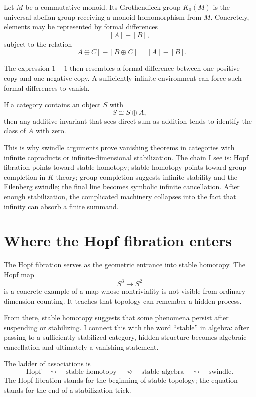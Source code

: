 \begin{definition}
Let \(M\) be a commutative monoid.  Its Grothendieck group \(K_0(M)\) is the universal abelian group receiving a monoid homomorphism from \(M\).  Concretely, elements may be represented by formal differences
\[
  [A]-[B],
\]
subject to the relation
\[
  [A\oplus C]-[B\oplus C]=[A]-[B].
\]
\end{definition}

The expression \(1-1\) then resembles a formal difference between one positive copy and one negative copy.  A sufficiently infinite environment can force such formal differences to vanish.

\begin{proposition}
If a category contains an object \(S\) with
\[
  S\cong S\oplus A,
\]
then any additive invariant that sees direct sum as addition tends to identify the class of \(A\) with zero.
\end{proposition}

This is why swindle arguments prove vanishing theorems in categories with infinite coproducts or infinite-dimensional stabilization.  The chain I see is: Hopf fibration points toward stable homotopy; stable homotopy points toward group completion in \(K\)-theory; group completion suggests infinite stability and the Eilenberg swindle; the final line becomes symbolic infinite cancellation.
After enough stabilization, the complicated machinery collapses into the fact that infinity can absorb a finite summand.

\section{Where the Hopf fibration enters}

The Hopf fibration serves as the geometric entrance into stable homotopy.  The Hopf map
\[
  S^3\to S^2
\]
is a concrete example of a map whose nontriviality is not visible from ordinary dimension-counting.  It teaches that topology can remember a hidden process.

From there, stable homotopy suggests that some phenomena persist after suspending or stabilizing.  I connect this with the word ``stable'' in algebra: after passing to a sufficiently stabilized category, hidden structure becomes algebraic cancellation and ultimately a vanishing statement.

The ladder of associations is
\[
  \text{Hopf}\quad\rightsquigarrow\quad
  \text{stable homotopy}\quad\rightsquigarrow\quad
  \text{stable algebra}\quad\rightsquigarrow\quad
  \text{swindle}.
\]
The Hopf fibration stands for the beginning of stable topology; the equation stands for the end of a stabilization trick.

